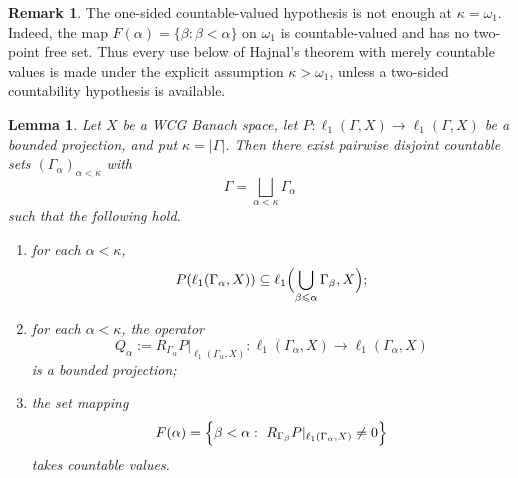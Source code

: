 \documentclass[11pt]{amsart}
\theoremstyle{plain}
\newtheorem{lemma}[theorem]{Lemma}
\theoremstyle{definition}
\newtheorem{remark}[theorem]{Remark}
\numberwithin{equation}{section}
\newcommand{\abs}[1]{\left|#1\right|}
\renewcommand{\le}{\leqslant}
\begin{document}
\begin{remark}\label{rem:omega-one-obstruction}
The one-sided countable-valued hypothesis is not enough at $\kappa=\omega_1$.
Indeed, the map $F(\alpha)=\{\beta:\beta<\alpha\}$ on $\omega_1$ is
countable-valued and has no two-point free set.  Thus every use below of
Hajnal's theorem with merely countable values is made under the explicit
assumption $\kappa>\omega_1$, unless a two-sided countability hypothesis is
available.
\end{remark}

\begin{lemma}\label{lem:block-decomp}
Let $X$ be a WCG Banach space, let $P\colon \ell_1(\Gamma,X)\to\ell_1(\Gamma,X)$ be a bounded projection, and put $\kappa=\abs{\Gamma}$.  Then there exist pairwise disjoint countable sets $(\Gamma_\alpha)_{\alpha<\kappa}$ with
\[
    \Gamma=\bigsqcup_{\alpha<\kappa}\Gamma_\alpha
\]
such that the following hold.
\begin{enumerate}[label=(\roman*), ref=(\roman*)]
    \item \label{item: bd-i} for each $\alpha<\kappa$,
    \[
    P(\ell_1(\Gamma_\alpha, X))\subseteq \ell_1\Bigl(\bigcup_{\beta\le \alpha}\Gamma_\beta, X\Bigr);
    \]
    \item \label{item: bd-ii} for each $\alpha<\kappa$, the operator
    \[
    Q_\alpha:= R_{\Gamma_\alpha} P|_{\ell_1(\Gamma_\alpha, X)}\colon \ell_1(\Gamma_\alpha, X)\to \ell_1(\Gamma_\alpha, X)
    \]
    is a bounded projection;
    \item\label{item: bd-iii} the set mapping
    \[
    F(\alpha)=\Bigl\{\beta<\alpha:\ R_{\Gamma_\beta} P|_{\ell_1(\Gamma_\alpha, X)}\neq 0\Bigr\}
    \]
    takes countable values.
\end{enumerate}
\end{lemma}
\end{document}
